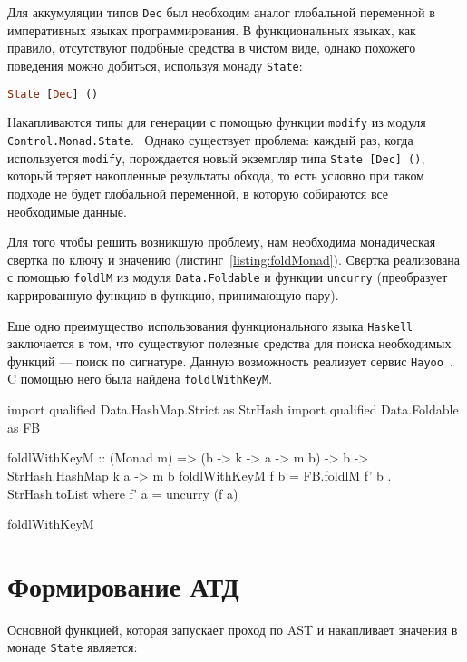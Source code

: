Для аккумуляции типов \lstinline{Dec} был необходим аналог глобальной переменной в императивных языках программирования. В функциональных языках, как правило, отсутствуют подобные средства в чистом виде, однако похожего поведения можно добиться, используя монаду \lstinline{State}:

\begin{lstlisting}[language=Haskell]
State [Dec] ()
\end{lstlisting}

Накапливаются типы для генерации с помощью функции \lstinline{modify} из модуля \lstinline{Control.Monad.State}.~\cite{stateM} Однако существует проблема: каждый раз, когда используется \lstinline{modify}, порождается новый экземпляр типа \lstinline{State [Dec] ()}, который теряет накопленные результаты обхода, то есть условно при таком подходе не будет глобальной переменной, в которую собираются все необходимые данные. 

Для того чтобы решить возникшую проблему, нам необходима монадическая свертка по ключу и значению (листинг~\ref{listing:foldMonad}). Свертка реализована с помощью \lstinline{foldlM} из модуля \lstinline{Data.Foldable} и функции \lstinline{uncurry} (преобразует каррированную функцию в функцию, принимающую пару).

Еще одно преимущество использования функционального языка \lstinline{Haskell} заключается в том, что существуют полезные средства для поиска необходимых функций --- поиск по сигнатуре. Данную возможность реализует сервис \lstinline{Hayoo}~\cite{hayoo}. C помощью него была найдена \lstinline{foldlWithKeyM}. 

\begin{ListingEnv}[H]
\begin{Verb}
import qualified Data.HashMap.Strict as StrHash
import qualified Data.Foldable    as FB

foldlWithKeyM :: (Monad m) => (b -> k -> a -> m b) -> b ->
                                       StrHash.HashMap k a -> m b
foldlWithKeyM f b = FB.foldlM f' b . StrHash.toList
  where f' a = uncurry (f a)
\end{Verb}
\caption{foldlWithKeyM}
\label{listing:foldMonad}
\end{ListingEnv} 

\section{Формирование АТД}

Основной функцией, которая запускает проход по AST и накапливает значения в монаде \lstinline{State} является: 


